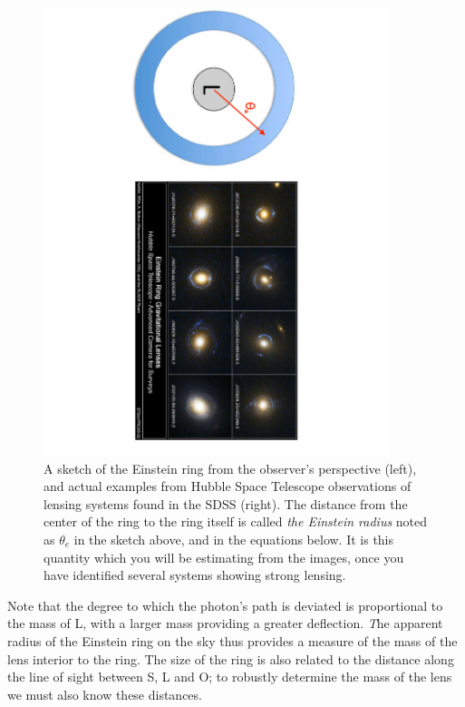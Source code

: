 \begin{figure}
	\centering
	\includegraphics[width=0.9\textwidth, angle=90]{gravitational-lensing/lensing2a}
	\caption{A sketch of the Einstein ring from the observer's perspective
		(left), and actual examples from Hubble Space Telescope observations
		of lensing systems found in the SDSS (right). The distance from the
		center of the ring to the ring itself is called \textit{the Einstein
			radius} noted as $\theta_e$ in the sketch above, and in the equations below. It is this quantity which you will be estimating from the images, once you have identified several systems showing strong lensing.}\label{gl:fig:rings}
\end{figure}

Note that the degree to which the photon's path is deviated is
proportional to the mass of L, with a larger mass providing a greater
deflection. {\emph The apparent radius of the Einstein ring on the sky thus
	provides a measure of the mass of the lens interior to the ring.} The
size of the ring is also related to the distance along the line of
sight between S, L and O; to robustly determine the mass of the lens
we must also know these distances. 

